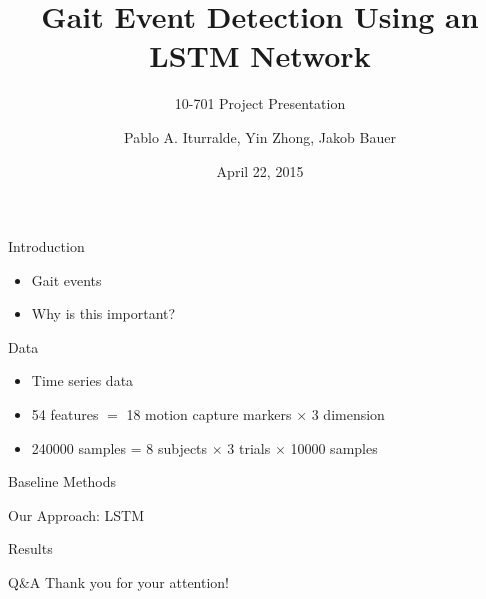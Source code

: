 \documentclass{beamer}
\title
{
    Gait Event Detection Using an LSTM Network
}
\subtitle
{
    10-701
    Project Presentation
}
\author
{
    Pablo A. Iturralde,
    Yin Zhong,
    Jakob Bauer
}
\date
{
    April 22, 2015
}
\begin{document}
\begin{frame}
  \titlepage
\end{frame}

\begin{frame}{Introduction}
    \begin{itemize}
        \item
        Gait events
        \item
        Why is this important?
    \end{itemize}
\end{frame}

\begin{frame}{Data}
    \begin{itemize}
        \item
        Time series data
        \item
        54 features $=$ 18 motion capture markers $\times$ 3 dimension
        \item
        \num{240000} samples = 8 subjects $\times$ 3 trials $\times$ \num{10000} samples
    \end{itemize}
\end{frame}

\begin{frame}{Baseline Methods}
\end{frame}

\begin{frame}{Our Approach: LSTM}
\end{frame}

\begin{frame}{Results}
\end{frame}

\begin{frame}{Q\&A}
    \Large
    \centering
    Thank you for your attention!
\end{frame}
\end{document}
